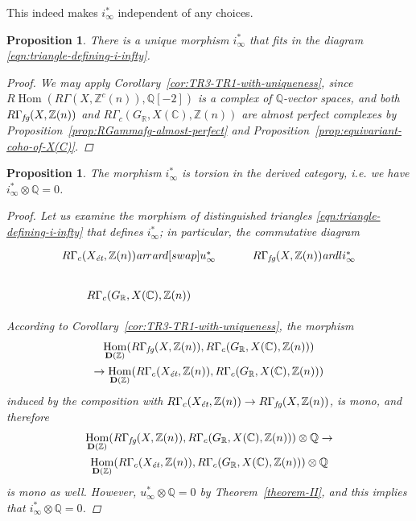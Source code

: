 \documentclass[leqno,12pt]{article}
\theoremstyle{plain}
\newtheorem{proposition}[theorem]{\indent\sc Proposition}
\theoremstyle{definition}
\DeclareMathOperator{\Hom}{Hom}
\newcommand{\CC}{\mathbb{C}}
\newcommand{\QQ}{\mathbb{Q}}
\newcommand{\RR}{\mathbb{R}}
\newcommand{\ZZ}{\mathbb{Z}}
\newcommand{\ar}{\text{\it ar}}
\newcommand{\et}{\text{\it \'{e}t}}
\newcommand{\fg}{\text{\it fg}}
\newcommand{\RHom}{R\!\Hom}
\newcommand{\DZ}{{\mathbf{D} (\ZZ)}}
\begin{document}
This indeed makes $i_\infty^*$ independent of any choices.

\begin{proposition}
  \label{prop:uniqueness-of-i-infty}
  There is a unique morphism $i_\infty^*$ that fits in the
  diagram \eqref{eqn:triangle-defining-i-infty}.

  \begin{proof}
    We may apply Corollary~\ref{cor:TR3-TR1-with-uniqueness}, since
    $\RHom (R\Gamma (X, \ZZ^c (n)), \QQ [-2])$ is a complex of $\QQ$-vector
    spaces, and both
    $R\Gamma_\fg (X, \ZZ (n))$ and
    $R\Gamma_c (G_\RR, X (\CC), \ZZ (n))$
    are almost perfect complexes by
    Proposition~\ref{prop:RGammafg-almost-perfect} and
    Proposition~\ref{prop:equivariant-coho-of-X(C)}.
  \end{proof}
\end{proposition}

\begin{proposition}
  \label{i-infty-is-torsion}
  The morphism $i_\infty^*$ is torsion in the derived category,
  i.e. we have $i_\infty^*\otimes \QQ = 0$.

  \begin{proof}
    Let us examine the morphism of distinguished triangles
    \eqref{eqn:triangle-defining-i-infty} that defines $i_\infty^*$; in
    particular, the commutative diagram
    \[ \begin{tikzcd}
      R\Gamma_c (X_\et, \ZZ (n)) \ar{r}\ar{d}[swap]{u_\infty^*} & R\Gamma_\fg (X, \ZZ (n))\ar{dl}{i_\infty^*} \\
      R\Gamma_c (G_\RR, X (\CC), \ZZ (n))
    \end{tikzcd} \]

    According to Corollary~\ref{cor:TR3-TR1-with-uniqueness}, the morphism
    \begin{multline*}
      \Hom_\DZ (R\Gamma_\fg (X,\ZZ (n)), R\Gamma_c (G_\RR, X (\CC), \ZZ (n))) \\
      \to
      \Hom_\DZ (R\Gamma_c (X_\et, \ZZ (n)), R\Gamma_c (G_\RR, X (\CC), \ZZ (n)))
    \end{multline*}
    induced by the composition with
    $R\Gamma_c (X_\et, \ZZ (n)) \to R\Gamma_\fg (X,\ZZ (n))$, is mono, and
    therefore
    \begin{multline*}
      \Hom_\DZ (R\Gamma_\fg (X,\ZZ (n)), R\Gamma_c (G_\RR, X (\CC), \ZZ (n)))\otimes \QQ \to\\
      \Hom_\DZ (R\Gamma_c (X_\et, \ZZ (n)), R\Gamma_c (G_\RR, X (\CC), \ZZ (n)))\otimes \QQ
    \end{multline*}
    is mono as well. However, $u_\infty^*\otimes \QQ = 0$ by
    Theorem~\ref{theorem-II}, and this implies that $i_\infty^*\otimes \QQ = 0$.
  \end{proof}
\end{proposition}
\end{document}
